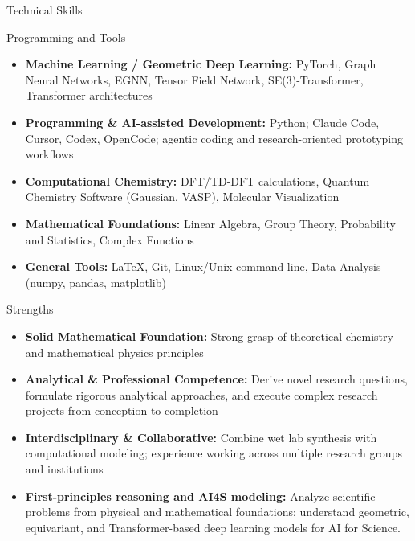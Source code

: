 \documentclass[]{mcdowellcv}
\begin{document}
\begin{cvsection}{Technical Skills}
	\begin{cvsubsection}{Programming and Tools}{}{}
		\begin{itemize}
			\item \textbf{Machine Learning / Geometric Deep Learning:} PyTorch, Graph Neural Networks, EGNN, Tensor Field Network, SE(3)-Transformer, Transformer architectures
			\item \textbf{Programming \& AI-assisted Development:} Python; Claude Code, Cursor, Codex, OpenCode; agentic coding and research-oriented prototyping workflows
			\item \textbf{Computational Chemistry:} DFT/TD-DFT calculations, Quantum Chemistry Software (Gaussian, VASP), Molecular Visualization
			\item \textbf{Mathematical Foundations:} Linear Algebra, Group Theory, Probability and Statistics, Complex Functions
			\item \textbf{General Tools:} LaTeX, Git, Linux/Unix command line, Data Analysis (numpy, pandas, matplotlib)
		\end{itemize}
	\end{cvsubsection}
\end{cvsection}

\begin{cvsection}{Strengths}
	\begin{cvsubsection}{}{}{}
		\begin{itemize}
			\item \textbf{Solid Mathematical Foundation:} Strong grasp of theoretical chemistry and mathematical physics principles
			\item \textbf{Analytical \& Professional Competence:} Derive novel research questions, formulate rigorous analytical approaches, and execute complex research projects from conception to completion
			\item \textbf{Interdisciplinary \& Collaborative:} Combine wet lab synthesis with computational modeling; experience working across multiple research groups and institutions
			\item \textbf{First-principles reasoning and AI4S modeling:} Analyze scientific problems from physical and mathematical foundations; understand geometric, equivariant, and Transformer-based deep learning models for AI for Science.
		\end{itemize}
	\end{cvsubsection}
\end{cvsection}
\end{document}
